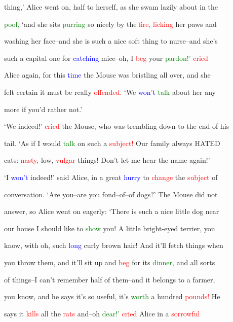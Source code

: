  thing,’ Alice went on, half to herself, as she swam lazily about in the

 \textcolor{green}{pool,} ‘and she sits \textcolor{green}{purring} so nicely by the \textcolor{red}{fire,} \textcolor{red}{licking} her paws and

 washing her face--and she is such a nice soft thing to nurse--and she’s

 such a capital one for \textcolor{blue}{catching} mice--oh, I \textcolor{red}{beg} your \textcolor{green}{pardon!’} \textcolor{red}{cried}

 Alice again, for this \textcolor{blue}{time} the Mouse was bristling all over, and she

 felt certain it must be really \textcolor{red}{offended.} ‘We \textcolor{blue}{won’t} \textcolor{green}{talk} about her any

 more if you’d rather not.’



 ‘We indeed!’ \textcolor{red}{cried} the Mouse, who was trembling down to the end of his

 tail. ‘As if I would \textcolor{green}{talk} on such a \textcolor{red}{subject!} Our family always HATED

 cats: \textcolor{red}{nasty,} low, \textcolor{red}{vulgar} things! Don’t let me hear the name again!’



 ‘I \textcolor{blue}{won’t} indeed!’ said Alice, in a great \textcolor{blue}{hurry} to \textcolor{red}{change} the \textcolor{red}{subject} of

 conversation. ‘Are you--are you fond--of--of dogs?’ The Mouse did not

 answer, so Alice went on eagerly: ‘There is such a nice little dog near

 our house I should like to \textcolor{green}{show} you! A little bright-eyed terrier, you

 know, with oh, such \textcolor{blue}{long} curly brown hair! And it’ll fetch things when

 you throw them, and it’ll sit up and \textcolor{red}{beg} for its \textcolor{green}{dinner,} and all sorts

 of things--I can’t remember half of them--and it belongs to a farmer,

 you know, and he says it’s so useful, it’s \textcolor{green}{worth} a hundred \textcolor{red}{pounds!} He

 says it \textcolor{red}{kills} all the \textcolor{red}{rats} and--oh \textcolor{green}{dear!’} \textcolor{red}{cried} Alice in a \textcolor{red}{sorrowful}

